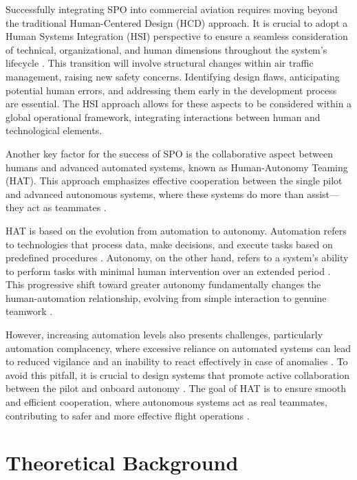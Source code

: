 \documentclass[12pt,a4paper]{article} %
\begin{document}
	Successfully integrating SPO into commercial aviation requires moving beyond the traditional Human-Centered Design (HCD) approach. It is crucial to adopt a Human Systems Integration (HSI) perspective to ensure a seamless consideration of technical, organizational, and human dimensions throughout the system's lifecycle \parencite{boy_prodec_2024}. This transition will involve structural changes within air traffic management, raising new safety concerns. Identifying design flaws, anticipating potential human errors, and addressing them early in the development process are essential. The HSI approach allows for these aspects to be considered within a global operational framework, integrating interactions between human and technological elements.
	
	Another key factor for the success of SPO is the collaborative aspect between humans and advanced automated systems, known as Human-Autonomy Teaming (HAT). This approach emphasizes effective cooperation between the single pilot and advanced autonomous systems, where these systems do more than assist—they act as teammates \parencite{shively_autonomy_2017}.
	
	HAT is based on the evolution from automation to autonomy. Automation refers to technologies that process data, make decisions, and execute tasks based on predefined procedures \parencite{hoff_trust_2015, hancock_imposing_2017}. Autonomy, on the other hand, refers to a system’s ability to perform tasks with minimal human intervention over an extended period \parencite{endsley_here_2017, holbrook_enabling_2020}. This progressive shift toward greater autonomy fundamentally changes the human-automation relationship, evolving from simple interaction to genuine teamwork \parencite{endsley_here_2017}.
	
	However, increasing automation levels also presents challenges, particularly automation complacency, where excessive reliance on automated systems can lead to reduced vigilance and an inability to react effectively in case of anomalies \parencite{lee_design_2023}. To avoid this pitfall, it is crucial to design systems that promote active collaboration between the pilot and onboard autonomy \parencite{endsley_here_2017}. The goal of HAT is to ensure smooth and efficient cooperation, where autonomous systems act as real teammates, contributing to safer and more effective flight operations \parencite{mcneese_chapter_2020}.
	
	\section{Theoretical Background}
\end{document}
